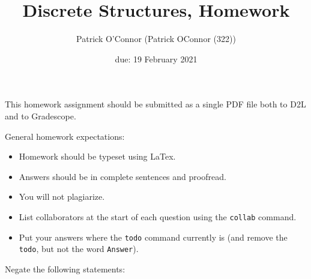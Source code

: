 \documentclass{article}
\title{Discrete Structures, Homework \hwnum}
\author{Patrick O'Connor (Patrick OConnor (322))}
\date{due: 19 February 2021}
\begin{document}
\maketitle

This homework assignment should be
submitted as a single PDF file both to D2L and to Gradescope.

General homework expectations:
\begin{itemize}
    \item Homework should be typeset using LaTex.
    \item Answers should be in complete sentences and proofread.
    \item You will not plagiarize.  \item List collaborators at the start of
    each question using the \texttt{collab} command.
    \item Put your answers where the \texttt{todo} command currently is (and
        remove the \texttt{todo}, but not the word \texttt{Answer}).
\end{itemize}

 
Negate the following statements:
\end{document}
